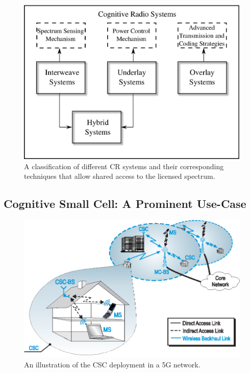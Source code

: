 \begin{figure}
\centering
\includegraphics[width = 0.85 \columnwidth]{figures/CR_paradigm}
\caption{A classification of different CR systems and their corresponding techniques that allow shared access to the licensed spectrum.}
\label{fig_Int:paradigm}
\end{figure}



\subsection{Cognitive Small Cell: A Prominent Use-Case }
\begin{figure}
\centering
\includegraphics[width = 0.9 \columnwidth]{figures/Cellular_Scenario_CR_T6}
\caption{An illustration of the CSC deployment in a 5G network.}
\label{fig_Int:archi}
\end{figure}



